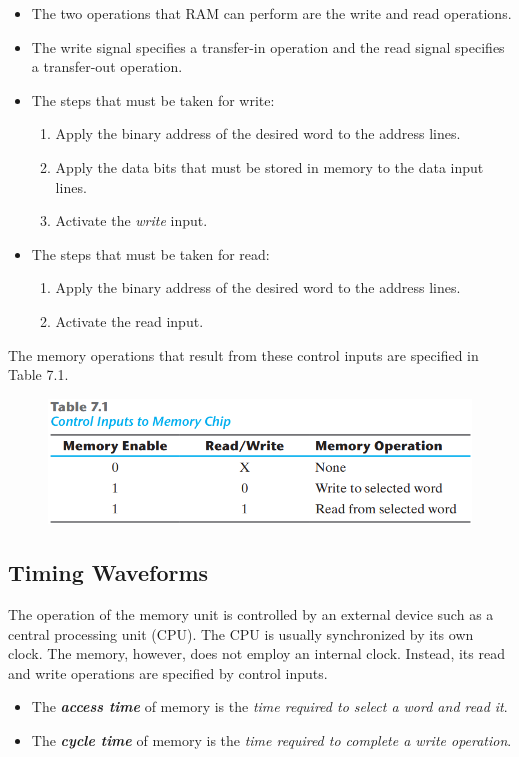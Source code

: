 \begin{itemize}[leftmargin=0.6cm]
  \item The two operations that RAM can perform are the write and read operations.
  \item The write signal specifies a transfer-in operation and the read signal specifies a transfer-out operation.
  
  \vspace*{\fill}
  \columnbreak

  \item The steps that must be taken for write:
    \begin{enumerate}[leftmargin=0.6cm]
      \item Apply the binary address of the desired word to the address lines.
      \item Apply the data bits that must be stored in memory to the data input lines.
      \item Activate the \textit{write} input.
    \end{enumerate}
  \item The steps that must be taken for read:
    \begin{enumerate}[leftmargin=0.6cm]
      \item Apply the binary address of the desired word to the address lines.
      \item Activate the read input.
    \end{enumerate}
\end{itemize}

The memory operations that result from these control inputs are specified in Table 7.1.
\begin{figure}[H]
  \centering
  \includegraphics[width=\linewidth]{img/table-7.1.png}
  \label{table:7.1}
\end{figure}

\subsection{Timing Waveforms}
\label{subsec:timing-waveforms}

The operation of the memory unit is controlled by an external device such as a central processing unit (CPU). The CPU is usually synchronized by its own clock. The memory, however, does not employ an internal clock. Instead, its read and write operations are specified by control inputs.
\begin{itemize}
  \item The \textbf{\textit{access time}} of memory is the \textit{time required to select a word and read it}. 
  \item The \textit{\textbf{cycle time}} of memory is the \textit{time required to complete a write operation}.
\end{itemize}

